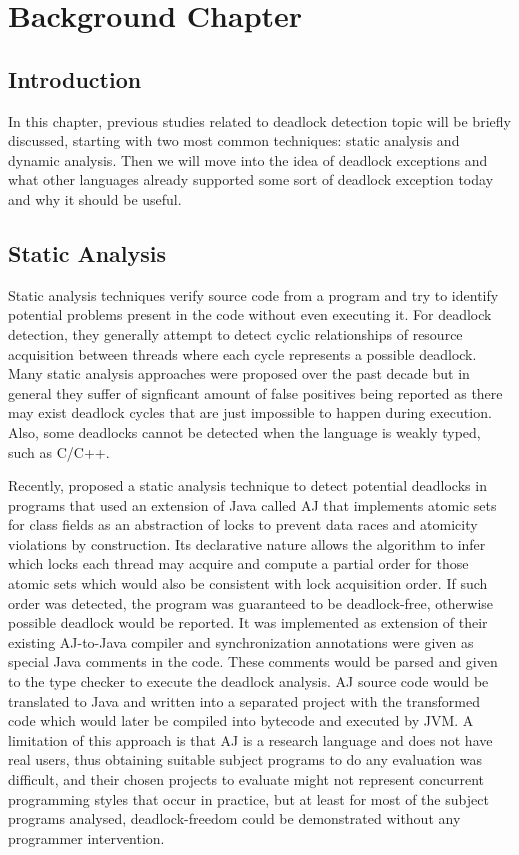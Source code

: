 \chapter{Background Chapter}
\label{background}

\section{Introduction}

In this chapter, previous studies related to deadlock detection topic will be briefly discussed, starting with two most common techniques: static analysis and dynamic analysis.
Then we will move into the idea of deadlock exceptions and what other languages already supported some sort of deadlock exception today and why it should be useful.

\section{Static Analysis}

Static analysis techniques verify source code from a program and try to identify potential problems present in the code without even executing it.
For deadlock detection, they generally attempt to detect cyclic relationships of resource acquisition between threads where each cycle represents a possible deadlock.
Many static analysis approaches were proposed over the past decade \citep{dawson}\citep{chand}\citep{vivek}\citep{praun}\citep{cormac}\citep{williams}
but in general they suffer of signficant amount of false positives being reported as there may exist deadlock cycles that are just impossible to happen during execution.
Also, some deadlocks cannot be detected when the language is weakly typed, such as C/C++.

Recently, \citet{marino} proposed a static analysis technique to detect potential deadlocks in programs that
used an extension of Java called AJ that implements atomic sets for class fields as an abstraction of locks to prevent data races
and atomicity violations by construction. Its declarative nature allows the algorithm to infer which locks each thread may acquire and
compute a partial order for those atomic sets which would also be consistent with lock acquisition order.
If such order was detected, the program was guaranteed to be deadlock-free, otherwise possible deadlock would be reported.
It was implemented as extension of their existing AJ-to-Java compiler and synchronization annotations were given as special Java comments in the code.
These comments would be parsed and given to the type checker to execute the deadlock analysis. AJ source code would be translated to Java and written into a separated project
with the transformed code which would later be compiled into bytecode and executed by JVM. A limitation of this approach is that AJ is a research language
and does not have real users, thus obtaining suitable subject programs to do any evaluation was difficult, and their chosen projects to evaluate might not
represent concurrent programming styles that occur in practice, but at least for most of the subject programs analysed, deadlock-freedom could be demonstrated
without any programmer intervention.

